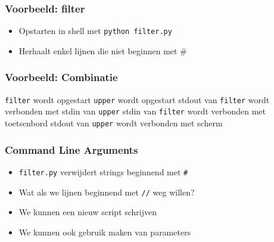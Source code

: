 \documentclass[dutch]{ucll-slides}
\begin{document}
\begin{frame}
  \frametitle{Voorbeeld: filter}
  \begin{itemize}
    \item Opstarten in shell met \texttt{python filter.py}
    \item Herhaalt enkel lijnen die niet beginnen met \#
  \end{itemize}
\end{frame}

\begin{frame}
  \frametitle{Voorbeeld: Combinatie}
  \begin{center}
  \end{center}
  \begin{overprint}
     \centering
    \texttt{filter} wordt opgestart
     \centering
    \texttt{upper} wordt opgestart
     \centering
    stdout van \texttt{filter} wordt verbonden met stdin van \texttt{upper}
     \centering
    stdin van \texttt{filter} wordt verbonden met toetsenbord
     \centering
    stdout van \texttt{upper} wordt verbonden met scherm
  \end{overprint}
\end{frame}

\begin{frame}
  \frametitle{Command Line Arguments}
  \begin{itemize}
    \item \texttt{filter.py} verwijdert strings beginnend met \texttt{\#}
    \item Wat als we lijnen beginnend met \texttt{//} weg willen?
    \item We kunnen een nieuw script schrijven
    \item We kunnen ook gebruik maken van parameters
  \end{itemize}
\end{frame}
\end{document}
